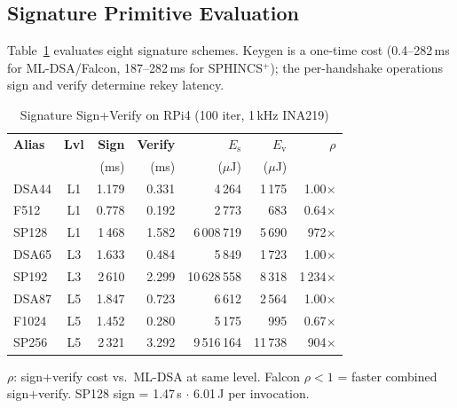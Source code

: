 \subsection{Signature Primitive Evaluation}
\label{sec:sig}

Table~\ref{tab:sig} evaluates eight signature schemes.  Keygen is a
one-time cost (0.4--282\,ms for ML-DSA/Falcon, 187--282\,ms for
SPHINCS$^+$); the per-handshake operations sign and verify determine
rekey latency.

\begin{table}[t]
\centering
\caption{Signature Sign+Verify on RPi4 (100 iter, 1\,kHz INA219)}
\label{tab:sig}
\footnotesize
\begin{tabular}{@{}lcrrrrr@{}}
\toprule
\textbf{Alias} & \textbf{Lvl} &
  \textbf{Sign} & \textbf{Verify} &
  \textbf{$E_\text{s}$} & \textbf{$E_\text{v}$} &
  \textbf{$\rho$} \\
& & (ms) & (ms) & ($\mu$J) & ($\mu$J) & \\
\midrule
DSA44  & L1 & 1.179 & 0.331  & 4\,264  & 1\,175  & 1.00$\times$ \\
F512   & L1 & 0.778 & 0.192  & 2\,773  & 683     & 0.64$\times$ \\
SP128  & L1 & 1\,468 & 1.582  & 6\,008\,719 & 5\,690 & 972$\times$ \\
\midrule
DSA65  & L3 & 1.633 & 0.484  & 5\,849  & 1\,723  & 1.00$\times$ \\
SP192  & L3 & 2\,610 & 2.299  & 10\,628\,558 & 8\,318 & 1\,234$\times$ \\
\midrule
DSA87  & L5 & 1.847 & 0.723  & 6\,612  & 2\,564  & 1.00$\times$ \\
F1024  & L5 & 1.452 & 0.280  & 5\,175  & 995     & 0.67$\times$ \\
SP256  & L5 & 2\,321 & 3.292  & 9\,516\,164 & 11\,738 & 904$\times$ \\
\bottomrule
\end{tabular}
\begin{tablenotes}
\footnotesize
\item $\rho$: sign+verify cost vs.\ ML-DSA at same level.
  Falcon $\rho < 1$ = faster combined sign+verify.
  SP128 sign = 1.47\,s $\cdot$ 6.01\,J per invocation.
\end{tablenotes}
\end{table}

